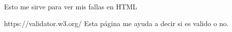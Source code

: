 Esto me sirve para ver mis fallas en HTML

https://validator.w3.org/   Esta página me ayuda a decir si es valido o no.